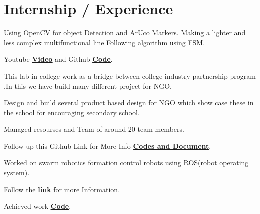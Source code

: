 \documentclass[]{font}
\begin{document}
\begin{minipage}[t]{0.64\textwidth} 


\section{Internship / Experience}

\vspace{\topsep} %
\begin{tightemize}
\item Using OpenCV for object Detection and ArUco Markers. Making a lighter and less complex multifunctional line Following algorithm using FSM.
\item Youtube \textbf{\href{https://youtu.be/FhUvQlrLWxc}{\underline{Video}}} and Github \textbf{\href{https://github.com/pranav083/FSM_code}{\underline{Code}}}. 
\end{tightemize}
\sectionsep

\begin{tightemize}
\item This lab in college work as a bridge between college-industry partnership program .In this we have build many different project for NGO.
\item Design and build several product based design for NGO which show
case these in the school for encouraging secondary school.
\item Managed resourses and Team of around 20 team members. 
\item Follow up this Github Link for More Info \textbf{\href{https://github.com/pranav083/Tinkering_project}{\underline{Codes and Document}}}.	
\end{tightemize}
\sectionsep

\begin{tightemize}
\item Worked on swarm robotics formation control robots using ROS(robot operating system).
\item Follow the \textbf{\href{http://crip.ml}{\underline{link}}} for more  Information.
\item Achieved work \textbf{\href{https://github.com/pranav083/ROS_work_earlier_nrf}{\underline{Code}}}.	
\end{tightemize}
\sectionsep


\end{minipage}
\end{document}

